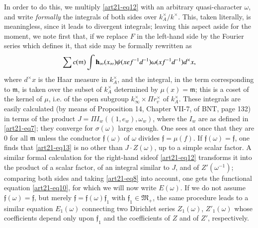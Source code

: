 In order to do this, we multiply \eqref{art21-eq12} with an arbitrary quasi-chara\-cter $\omega$, and write {\em formally} the integrals of both sides over $k^{\times}_{A}/k^{\times}$. This, taken literally, is meaningless, since it leads to divergent integrals; leaving this aspect aside for the moment, we note first that, if we replace $F$ in the left-hand side by the Fourier series which defines it, that side may be formally rewritten as 
\begin{equation}
\sum c(\mathfrak{m})\int \mathbf{h}_{\infty}(x_{\infty})\psi (xef^{-1}d^{-1})\omega(xf^{-1}d^{-1})d^{\times}x,\label{art21-eq13}
\end{equation}
where $d^{\times}x$ is the Haar measure in $k^{\times}_{A}$, and the integral, in the term corresponding to $\mathfrak{m}$, is taken over the subset of $k^{\times}_{A}$ determined by $\mu(x)=\mathfrak{m}$; this is a coset of the kernel of $\mu$, i.e. of the open subgroup $k^{\times}_{\infty}\times \Pi r^{\times}_{v}$ of $k^{\times}_{A}$. These integrals are easily calculated (by means of Proposition 14, Chapter VII-7, of BNT, page 132) in terms of the product $J=\Pi I_{w}((1,e_{w}),\omega_{w})$, where the $I_{w}$ are as defined in \eqref{art21-eq7}; they converge for $\sigma(\omega)$ large enough. One sees at once that they are $0$ for all $\mathfrak{m}$ unless the conductor $\mathfrak{f}(\omega)$ of $\omega$ divides $\mathfrak{f}=\mu(f)$. If $\mathfrak{f}(\omega)=\mathfrak{f}$, one finds that \eqref{art21-eq13} is no other than $J\cdot Z(\omega)$, up to a simple scalar factor. A similar formal calculation for the right-hand side\pageoriginale of \eqref{art21-eq12} transforms it into the product of a scalar factor, of an integral similar to $J$, and of $Z'(\omega^{-1})$; comparing both sides and taking \eqref{art21-eq8} into account, one gets the functional equation \eqref{art21-eq10}, for which we will now write $E(\omega)$. If we do not assume $\mathfrak{f}(\omega)=\mathfrak{f}$, but merely $\mathfrak{f}=\mathfrak{f}(\omega)\mathfrak{f}_{1}$ with $\mathfrak{f}_{1}\in \mathfrak{M}_{+}$, the same procedure leads to a similar equation $E_{1}(\omega)$ connecting two Dirichlet series $Z_{1}(\omega)$, $Z'_{1}(\omega)$ whose coefficients depend only upon $\mathfrak{f}_{1}$ and the coefficients of $Z$ and of $Z'$, respectively.

